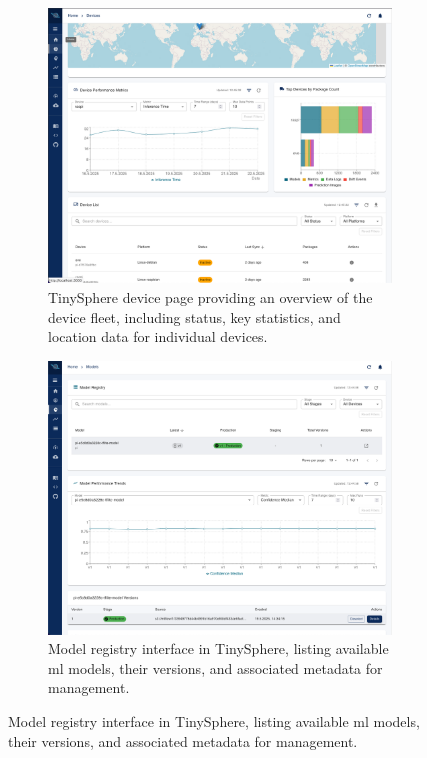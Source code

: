 \begin{figure}[htbp]
    \centering

    \begin{subfigure}[b]{0.48\textwidth}
        \centering
        \includegraphics[width=\textwidth]{figs/framework/device-page.png}
        \caption{TinySphere device page providing an overview of the device fleet, including status, key statistics, and location data for individual devices.}
        \label{fig:ui_device_page}
    \end{subfigure}
    \hfill
    \begin{subfigure}[b]{0.48\textwidth}
        \centering
        \includegraphics[width=\textwidth]{figs/framework/model-page.png}
        \caption{Model registry interface in TinySphere, listing available \gls{ml} models, their versions, and associated metadata for management.}
        \label{fig:ui_model_registry}
    \end{subfigure}


\end{figure}
